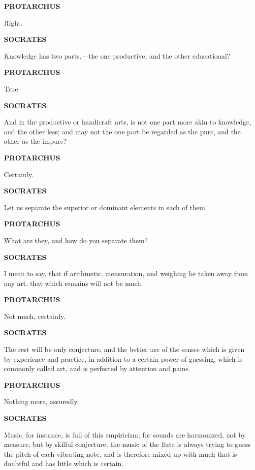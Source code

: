 \documentclass[11pt,letter]{article}
\begin{document}
\par \textbf{PROTARCHUS}
\par   Right.

\par \textbf{SOCRATES}
\par   Knowledge has two parts,—the one productive, and the other educational?

\par \textbf{PROTARCHUS}
\par   True.

\par \textbf{SOCRATES}
\par   And in the productive or handicraft arts, is not one part more akin to knowledge, and the other less; and may not the one part be regarded as the pure, and the other as the impure?

\par \textbf{PROTARCHUS}
\par   Certainly.

\par \textbf{SOCRATES}
\par   Let us separate the superior or dominant elements in each of them.

\par \textbf{PROTARCHUS}
\par   What are they, and how do you separate them?

\par \textbf{SOCRATES}
\par   I mean to say, that if arithmetic, mensuration, and weighing be taken away from any art, that which remains will not be much.

\par \textbf{PROTARCHUS}
\par   Not much, certainly.

\par \textbf{SOCRATES}
\par   The rest will be only conjecture, and the better use of the senses which is given by experience and practice, in addition to a certain power of guessing, which is commonly called art, and is perfected by attention and pains.

\par \textbf{PROTARCHUS}
\par   Nothing more, assuredly.

\par \textbf{SOCRATES}
\par   Music, for instance, is full of this empiricism; for sounds are harmonized, not by measure, but by skilful conjecture; the music of the flute is always trying to guess the pitch of each vibrating note, and is therefore mixed up with much that is doubtful and has little which is certain.
\end{document}
